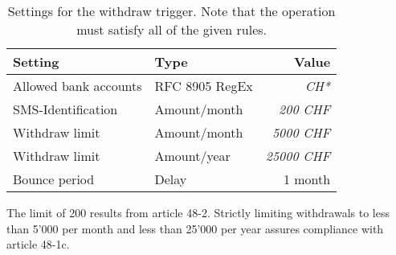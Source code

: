 \begin{table}[h!]
  \caption{Settings for the withdraw trigger. Note that the operation
  must satisfy all of the given rules.} \label{table:kyc:withdraw:settings}
  \begin{tabular}{l|l|r}
    {\bf Setting}            & {\bf Type}         &  {\bf Value} \\ \hline \hline
    Allowed bank accounts    & RFC 8905 RegEx     &  {\em CH*} \\ \hline
    SMS-Identification       & Amount/month       &  {\em 200 CHF} \\
    Withdraw limit           & Amount/month       &  {\em 5000 CHF} \\
    Withdraw limit           & Amount/year        &  {\em 25000 CHF} \\
    Bounce period            & Delay              &  1 month \\
  \end{tabular}
\end{table}

The limit of 200 \CURRENCY{} results from article 48-2.  Strictly limiting
withdrawals to less than 5'000 \CURRENCY{} per month and less than 25'000
\CURRENCY{} per year assures compliance with article 48-1c.
